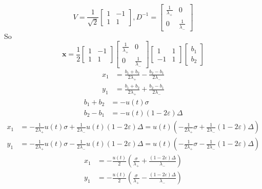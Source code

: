 \begin{equation}
	V =
	\frac{1}{\sqrt{2}}
	\begin{bmatrix}
		1 & -1\\
		1 & 1
	\end{bmatrix}
	,
	D^{-1} =
	\begin{bmatrix}
		\frac{1}{\lambda_+} & 0\\
		0 & \frac{1}{\lambda_-}
	\end{bmatrix}
\end{equation}
So 
\begin{equation}
	\symbf{x} =
		\frac{1}{2}
	\begin{bmatrix}
		1 & -1\\
		1 & 1
	\end{bmatrix}
	\begin{bmatrix}
		\frac{1}{\lambda_+} & 0\\
		0 & \frac{1}{\lambda_-}
	\end{bmatrix}
	\begin{bmatrix}
		1 & 1\\
		-1 & 1
	\end{bmatrix}
	\begin{bmatrix}
		b_1\\b_2
	\end{bmatrix}
\end{equation}
\begin{align}
	x_1 &= \frac{b_1+b_2}{2\lambda_+} - \frac{b_2-b_1}{2\lambda_-}\\
	y_1 &= \frac{b_1+b_2}{2\lambda_+} + \frac{b_2 - b_1}{2\lambda_-}
\end{align}
\begin{align}
	b_1 + b_2 &= -u(t)\sigma\\
	b_2 - b_1 &= -u(t)(1-2\varepsilon)\Delta
\end{align}
\begin{align}
	x_1 &= -\frac{1}{2\lambda_+}u(t)\sigma + \frac{1}{2\lambda_-} u(t)(1-2\varepsilon)\Delta =
	u(t)\left(-\frac{1}{2\lambda_+}\sigma + \frac{1}{2\lambda_-} (1-2\varepsilon)\Delta \right)\\
	y_1 &= -\frac{1}{2\lambda_+}u(t)\sigma - \frac{1}{2\lambda_-} u(t)(1-2\varepsilon)\Delta = 
	u(t)\left( -\frac{1}{2\lambda_+}\sigma - \frac{1}{2\lambda_-}(1-2\varepsilon)\Delta\right)
\end{align}
\begin{align}
	x_1 &= -\frac{u(t)}{2}\left(\frac{\sigma}{\lambda_+} + \frac{(1-2\varepsilon)\Delta}{\lambda_-}\right)\\
	y_1 &= -\frac{u(t)}{2}\left(\frac{\sigma}{\lambda_+} - \frac{(1-2\varepsilon)\Delta}{\lambda_-}\right)
\end{align}

